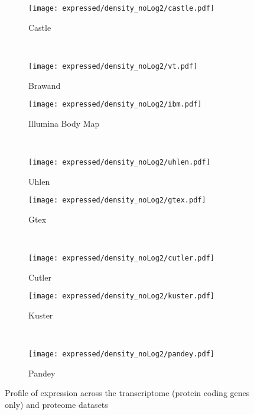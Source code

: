 \begin{figure}[!ht]
    \centering
    \begin{subfigure}[b]{0.35\textwidth}
        \centering \texttt{[image: expressed/density\_noLog2/castle.pdf]}
        \caption{Castle}\label{fig:densityCastle_nolog2}
    \end{subfigure}%
~%
    \begin{subfigure}[b]{0.35\textwidth}
        \centering \texttt{[image: expressed/density\_noLog2/vt.pdf]}
        \caption{Brawand}\label{fig:densityBrawand_nolog2}
    \end{subfigure}

    \begin{subfigure}[b]{0.35\textwidth}
        \centering \texttt{[image: expressed/density\_noLog2/ibm.pdf]}
        \caption{Illumina Body Map}\label{fig:densityIBM_nolog2}
    \end{subfigure}%
~%
    \begin{subfigure}[b]{0.35\textwidth}
        \centering \texttt{[image: expressed/density\_noLog2/uhlen.pdf]}
        \caption{Uhlen}\label{fig:densityUhlen_nolog2}
    \end{subfigure}

    \begin{subfigure}[b]{0.35\textwidth}
        \centering \texttt{[image: expressed/density\_noLog2/gtex.pdf]}
        \caption{Gtex}\label{fig:densityGtex_nolog2}
    \end{subfigure}%
~%
    \begin{subfigure}[b]{0.35\textwidth}
        \centering \texttt{[image: expressed/density\_noLog2/cutler.pdf]}
        \caption{Cutler}\label{fig:densityCutler_nolog2}
    \end{subfigure}

    \begin{subfigure}[b]{0.35\textwidth}
        \centering \texttt{[image: expressed/density\_noLog2/kuster.pdf]}
        \caption{Kuster}\label{fig:densityKuster_nolog2}
    \end{subfigure}%
~%
    \begin{subfigure}[b]{0.35\textwidth}
        \centering \texttt{[image: expressed/density\_noLog2/pandey.pdf]}
        \caption{Pandey}\label{fig:densityPandey_nolog2}
    \end{subfigure}
    \caption{Profile of expression across the transcriptome (protein coding
    genes only) and proteome datasets}\label{fig:distribPlot_noLog2}
\end{figure}

